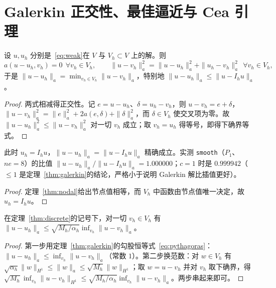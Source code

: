 \section{Galerkin 正交性、最佳逼近与 Cea 引理}

\begin{theorem}[正交性与能量范数下的最佳逼近]
\label{thm:galerkin}
设 $u,u_h$ 分别是~\eqref{eq:weak}在 $V$ 与 $V_h\subset V$ 上的解。则
\begin{equation}
  a(u-u_h,v_h)=0\ \ \forall v_h\in V_h,\qquad
  \|u-v_h\|_a^2=\|u-u_h\|_a^2+\|u_h-v_h\|_a^2\ \ \forall v_h\in V_h ,
  \label{eq:pythagoras}
\end{equation}
于是 $\|u-u_h\|_a=\min_{v_h\in V_h}\|u-v_h\|_a$，特别地 $\|u-u_h\|_a\le\|u-I_hu\|_a$。
\end{theorem}
\begin{proof}
两式相减得正交性。记 $e=u-u_h$、$\delta=u_h-v_h$，则
$u-v_h=e+\delta$，$\|u-v_h\|_a^2=\|e\|_a^2+2a(e,\delta)+\|\delta\|_a^2$，而 $\delta\in V_h$
使交叉项为零。故 $\|u-u_h\|_a^2\le\|u-v_h\|_a^2$ 对一切 $v_h$ 成立；取 $v_h=u_h$ 得等号，即得下确界等式。
\end{proof}

\begin{corollary}
\label{cor:interp}
此时 $u_h=I_hu$，$\|u-u_h\|_a=\|u-I_hu\|_a$ 精确成立。实测 \texttt{smooth}（$P_1$、$ne=8$）的比值
$\|u-u_h\|_a/\|u-I_hu\|_a=1.000000$；$c=1$ 时是 $0.999942$（$\le1$ 是定理~\ref{thm:galerkin}的结论，严格小于说明
Galerkin 解比插值更好）。
\end{corollary}
\begin{proof}
定理~\ref{thm:nodal}给出节点值相等，而 $V_h$ 中函数由节点值唯一决定，故 $u_h=I_hu$。
\end{proof}

\begin{theorem}[Cea 引理]
\label{thm:cea}
在定理~\ref{thm:discrete}的记号下，对一切 $v_h\in V_h$ 有
$\|u-u_h\|_a\le\sqrt{M_h/\alpha_h}\inf_{v_h}\|u-v_h\|_a$。
\end{theorem}
\begin{proof}
第一步用定理~\ref{thm:galerkin}的勾股恒等式~\eqref{eq:pythagoras}：$\|u-u_h\|_a\le\inf_{v_h}\|u-v_h\|_a$（常数 $1$）。第二步换范数：对 $w\in V_h$ 有
$\sqrt{\alpha_h}\|w\|_{H^1}\le\|w\|_a\le\sqrt{M_h}\|w\|_{H^1}$；取 $w=u-v_h$ 并对 $v_h$ 取下确界，得
$\sqrt{M_h}\inf_{v_h}\|u-v_h\|_{H^1}\le\sqrt{M_h/\alpha_h}\inf_{v_h}\|u-v_h\|_a$。两步串起来即可。
\end{proof}

